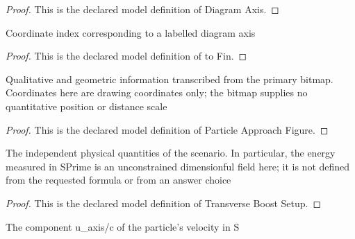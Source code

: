 \begin{proof}
  This is the declared model definition of Diagram Axis.
\end{proof}
\begin{definition}[to Fin]
  \label{def:physics:phyx-mini-0560:phyxminiproblems-problemphyxmini0560-diagramaxis-tofin}
  Coordinate index corresponding to a labelled diagram axis
\end{definition}
\begin{proof}
  This is the declared model definition of to Fin.
\end{proof}
\begin{definition}
  \label{def:physics:phyx-mini-0560:phyxminiproblems-problemphyxmini0560-particleapproachfigure}
  Qualitative and geometric information transcribed from the primary bitmap. Coordinates here are drawing coordinates only; the bitmap supplies no quantitative position or distance scale
\end{definition}
\begin{proof}
  This is the declared model definition of Particle Approach Figure.
\end{proof}
\begin{definition}
  \label{def:physics:phyx-mini-0560:phyxminiproblems-problemphyxmini0560-transverseboostsetup}
  The independent physical quantities of the scenario. In particular, the energy measured in SPrime is an unconstrained dimensionful field here; it is not defined from the requested formula or from an answer choice
\end{definition}
\begin{proof}
  This is the declared model definition of Transverse Boost Setup.
\end{proof}
\begin{definition}
  \label{def:physics:phyx-mini-0560:phyxminiproblems-problemphyxmini0560-velocityfractioncomponent}
  The component u\_axis/c of the particle's velocity in S
\end{definition}
